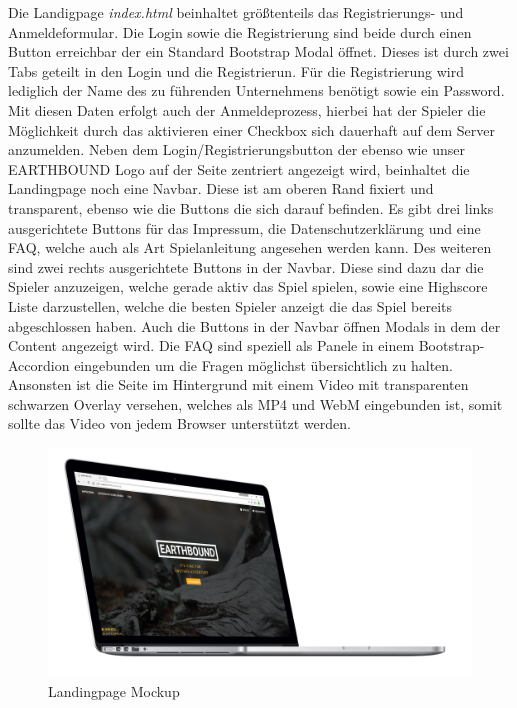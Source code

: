 Die Landigpage \textit{index.html} beinhaltet größtenteils das Registrierungs- und Anmeldeformular. Die Login sowie die Registrierung sind beide durch einen Button erreichbar der ein Standard Bootstrap Modal öffnet. Dieses ist durch zwei Tabs geteilt in den Login und die Registrierun. Für die Registrierung wird lediglich der Name des zu führenden Unternehmens benötigt sowie ein Password. Mit diesen Daten erfolgt auch der Anmeldeprozess, hierbei hat der Spieler die Möglichkeit durch das aktivieren einer Checkbox sich dauerhaft auf dem Server anzumelden. Neben dem Login/Registrierungsbutton der ebenso wie unser EARTHBOUND Logo auf der Seite zentriert angezeigt wird, beinhaltet die Landingpage noch eine Navbar. Diese ist am oberen Rand fixiert und transparent, ebenso wie die Buttons die sich darauf befinden. Es gibt drei links ausgerichtete Buttons für das Impressum, die Datenschutzerklärung und eine FAQ, welche auch als Art Spielanleitung angesehen werden kann. Des weiteren sind zwei rechts ausgerichtete Buttons in der Navbar. Diese sind dazu dar die Spieler anzuzeigen, welche gerade aktiv das Spiel spielen, sowie eine Highscore Liste darzustellen, welche die besten Spieler anzeigt die das Spiel bereits abgeschlossen haben. Auch die Buttons in der Navbar öffnen Modals in dem der Content angezeigt wird. Die FAQ sind speziell als Panele in einem Bootstrap-Accordion eingebunden um die Fragen möglichst übersichtlich zu halten.
Ansonsten ist die Seite im Hintergrund mit einem Video mit transparenten schwarzen Overlay versehen, welches als MP4 und WebM eingebunden ist, somit sollte das Video von jedem Browser unterstützt werden.
\begin{figure}
	\centering
	\includegraphics[scale=0.3]{img/mock.png}
	\captionsetup{format=hang}
	\caption[Landingpage Mockup]{\label{fig:landingpage}Landingpage Mockup}
\end{figure}
